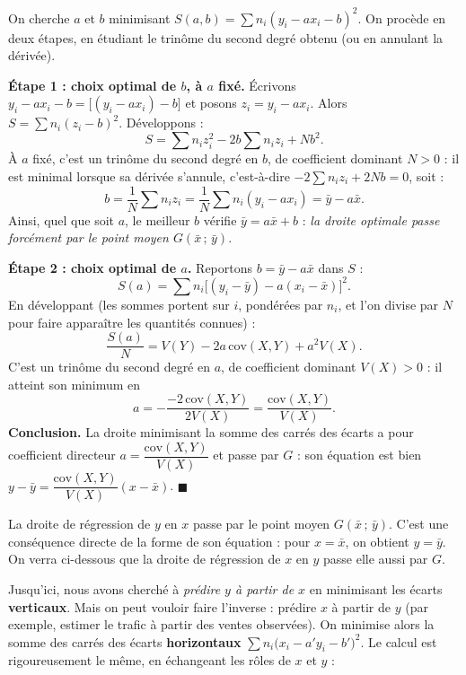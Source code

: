 \documentclass[11pt]{article}
\newcounter{popsec}
\newcounter{popsub}
\newcommand{\courssub}[1]{%
  \stepcounter{popsub}%
  \par\vspace{9pt}\noindent{\popxbold\fontsize{11.5}{13}\selectfont\color{popink}{\color{poporange}\thepopsec.\thepopsub}\hspace{6pt}#1}\par\nopagebreak\vspace{4pt}
}
\begin{document}
\begin{experience}
On cherche $a$ et $b$ minimisant $S(a,b)=\sum n_i(y_i-ax_i-b)^2$. On procède en deux étapes, en étudiant le trinôme du second degré obtenu (ou en annulant la dérivée).

\textbf{Étape 1 : choix optimal de $b$, à $a$ fixé.} Écrivons $y_i-ax_i-b=\bigl[(y_i-ax_i)-b\bigr]$ et posons $z_i=y_i-ax_i$. Alors $S=\sum n_i(z_i-b)^2$. Développons :
\[
S=\sum n_i z_i^2-2b\sum n_i z_i+Nb^2.
\]
À $a$ fixé, c'est un trinôme du second degré en $b$, de coefficient dominant $N>0$ : il est minimal lorsque sa dérivée s'annule, c'est-à-dire $-2\sum n_i z_i+2Nb=0$, soit :
\[
b=\frac{1}{N}\sum n_i z_i=\frac{1}{N}\sum n_i(y_i-ax_i)=\bar{y}-a\bar{x}.
\]
Ainsi, quel que soit $a$, le meilleur $b$ vérifie $\bar{y}=a\bar{x}+b$ : \emph{la droite optimale passe forcément par le point moyen $G(\bar{x}\,;\,\bar{y})$}.

\textbf{Étape 2 : choix optimal de $a$.} Reportons $b=\bar{y}-a\bar{x}$ dans $S$ :
\[
S(a)=\sum n_i\bigl[(y_i-\bar{y})-a(x_i-\bar{x})\bigr]^2.
\]
En développant (les sommes portent sur $i$, pondérées par $n_i$, et l'on divise par $N$ pour faire apparaître les quantités connues) :
\[
\frac{S(a)}{N}=V(Y)-2a\,\mathrm{cov}(X,Y)+a^2 V(X).
\]
C'est un trinôme du second degré en $a$, de coefficient dominant $V(X)>0$ : il atteint son minimum en
\[
a=-\frac{-2\,\mathrm{cov}(X,Y)}{2V(X)}=\frac{\mathrm{cov}(X,Y)}{V(X)}.
\]
\textbf{Conclusion.} La droite minimisant la somme des carrés des écarts a pour coefficient directeur $a=\dfrac{\mathrm{cov}(X,Y)}{V(X)}$ et passe par $G$ : son équation est bien $y-\bar{y}=\dfrac{\mathrm{cov}(X,Y)}{V(X)}(x-\bar{x})$. $\blacksquare$
\end{experience}

\begin{propriete}
La droite de régression de $y$ en $x$ passe par le point moyen $G(\bar{x}\,;\,\bar{y})$. C'est une conséquence directe de la forme de son équation : pour $x=\bar{x}$, on obtient $y=\bar{y}$. On verra ci-dessous que la droite de régression de $x$ en $y$ passe elle aussi par $G$.
\end{propriete}

\courssub{La droite de régression de $x$ en $y$}

Jusqu'ici, nous avons cherché à \emph{prédire $y$ à partir de $x$} en minimisant les écarts \textbf{verticaux}. Mais on peut vouloir faire l'inverse : prédire $x$ à partir de $y$ (par exemple, estimer le trafic à partir des ventes observées). On minimise alors la somme des carrés des écarts \textbf{horizontaux} $\sum n_i\bigl(x_i-a'y_i-b'\bigr)^2$. Le calcul est rigoureusement le même, en échangeant les rôles de $x$ et $y$ :
\end{document}
